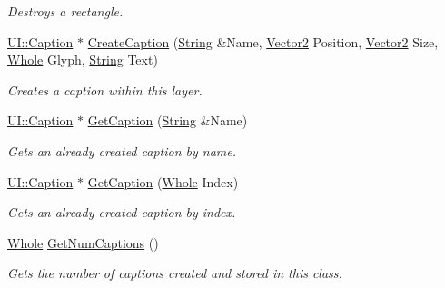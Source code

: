 \begin{DoxyCompactItemize}
\begin{DoxyCompactList}\small\item\em Destroys a rectangle. \item\end{DoxyCompactList}\item 
\hyperlink{classphys_1_1UI_1_1Caption}{UI::Caption} $\ast$ \hyperlink{classphys_1_1UILayer_ad7675adfc312bcb6a79703f88f7d6ed1}{CreateCaption} (\hyperlink{namespacephys_aa03900411993de7fbfec4789bc1d392e}{String} \&Name, \hyperlink{classphys_1_1Vector2}{Vector2} Position, \hyperlink{classphys_1_1Vector2}{Vector2} Size, \hyperlink{namespacephys_a460f6bc24c8dd347b05e0366ae34f34a}{Whole} Glyph, \hyperlink{namespacephys_aa03900411993de7fbfec4789bc1d392e}{String} Text)
\begin{DoxyCompactList}\small\item\em Creates a caption within this layer. \item\end{DoxyCompactList}\item 
\hyperlink{classphys_1_1UI_1_1Caption}{UI::Caption} $\ast$ \hyperlink{classphys_1_1UILayer_a4c0992c816863e5b7673d8e8b6f04931}{GetCaption} (\hyperlink{namespacephys_aa03900411993de7fbfec4789bc1d392e}{String} \&Name)
\begin{DoxyCompactList}\small\item\em Gets an already created caption by name. \item\end{DoxyCompactList}\item 
\hyperlink{classphys_1_1UI_1_1Caption}{UI::Caption} $\ast$ \hyperlink{classphys_1_1UILayer_a0f087439496766594aa3f94a8ef2ec2b}{GetCaption} (\hyperlink{namespacephys_a460f6bc24c8dd347b05e0366ae34f34a}{Whole} Index)
\begin{DoxyCompactList}\small\item\em Gets an already created caption by index. \item\end{DoxyCompactList}\item 
\hyperlink{namespacephys_a460f6bc24c8dd347b05e0366ae34f34a}{Whole} \hyperlink{classphys_1_1UILayer_a76b9f48b8b40c4e933dc1f3cf624ffbc}{GetNumCaptions} ()
\begin{DoxyCompactList}\small\item\em Gets the number of captions created and stored in this class. \item\end{DoxyCompactList}\item 

\end{DoxyCompactItemize}
